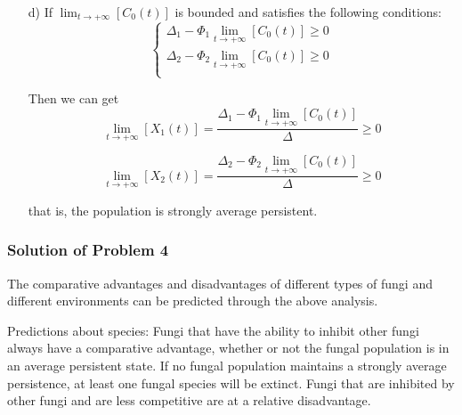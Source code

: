 \begin{itemize}
    \item [d)] 
    If $\lim_{t \to +\infty}[C_{0}(t)]$ is bounded and satisfies the following conditions:
    \begin{equation}\label{}
        \left\{
        \begin{array}{l}
            \Delta_{1}-\Phi_{1} \lim_{t \to +\infty}[C_{0}(t)]\geqslant 0 \\
            \Delta_{2}-\Phi_{2} \lim_{t \to +\infty}[C_{0}(t)]\geqslant 0 \\
        \end{array}
        \right.
        \end{equation}
    
    Then we can get
    \begin{equation}\label{}
        \lim_{t \to +\infty}[X_{1}(t)]=\frac{\Delta_{1}-\Phi_{1} \lim_{t \to +\infty}[C_{0}(t)]}{\Delta}\geqslant 0
    \end{equation}
    
    \begin{equation}\label{}
        \lim_{t \to +\infty}[X_{2}(t)]=\frac{\Delta_{2}-\Phi_{2} \lim_{t \to +\infty}[C_{0}(t)]}{\Delta}\geqslant 0
    \end{equation}

    that is, the population is strongly average persistent.
\end{itemize}

\subsubsection{Solution of Problem 4}

The comparative advantages and disadvantages of different types of fungi and different environments can be predicted through the above analysis.

Predictions about species: Fungi that have the ability to inhibit other fungi always have a comparative advantage, whether or not the fungal population is in an average persistent state. If no fungal population maintains a strongly average persistence, at least one fungal species will be extinct. Fungi that are inhibited by other fungi and are less competitive are at a relative disadvantage.

